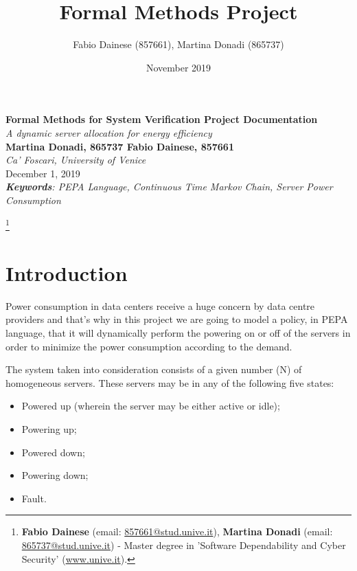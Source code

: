 \documentclass{article}
\title{Formal Methods Project}
\author{Fabio Dainese (857661), Martina Donadi (865737)}
\date{November 2019}
\newcommand{\blank}[1]{\hspace*{#1}\linebreak[0]}
\begin{document}
\begin{titlepage}
    \begin{center}
      \vspace{2.5cm}\Huge\textbf{Formal Methods for System Verification Project Documentation}\\
      \vspace{2cm}
      \LARGE\textit{A dynamic server allocation for energy efficiency}\\
      \vspace{2cm}\hspace{1cm}\Large\textbf{Martina Donadi, 865737 \hfill Fabio Dainese, 857661}\blank{1cm}\\
      \vspace{1.75cm}\Large\textit{Ca’ Foscari, University of Venice}\\
      \vspace{0.75cm}\Large December 1, 2019\\
      \vspace{3cm}\large\textit{\textbf{Keywords}: PEPA Language, Continuous Time Markov Chain, Server Power Consumption}
   \end{center}
   \let\thefootnote\relax\footnote{\textbf{Fabio Dainese} (email: \href{mailto:857661@stud.unive.it}{857661@stud.unive.it}), \textbf{Martina Donadi} (email: \href{mailto:865737@stud.unive.it}{865737@stud.unive.it}) - Master degree in 'Software Dependability and Cyber Security' (\href{www.unive.it}{www.unive.it}).}
\end{titlepage}

\tableofcontents
\newpage

\justifying
\section{Introduction}
Power consumption in data centers receive a huge concern by data centre providers and that's why in this project we are going to model a policy, in PEPA language, that it will dynamically perform the powering on or off of the servers in order to minimize the power consumption according to the demand.\newline

\par\noindent The system taken into consideration consists of a given number (N) of homogeneous servers. These servers may be in any of the following five states:

\begin{itemize}
    \item Powered up (wherein the server may be either active or idle);
    \item Powering up;
    \item Powered down;
    \item Powering down;
    \item Fault.
\end{itemize}
\end{document}
